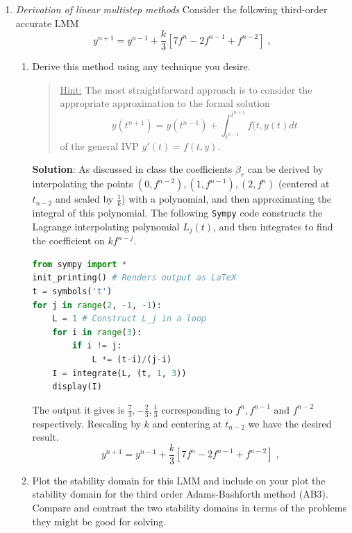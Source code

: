 \documentclass[final,oneside,onecolumn]{article}
\begin{document}
\begin{enumerate}
\bigbreak
\item \emph{Derivation of linear multistep methods} Consider the following third-order accurate LMM
\begin{equation*}
y^{n+1} = y^{n-1} + \dfrac{k}{3}\left[7f^{n} - 2f^{n-1} + f^{n-2}\right]\;,
\end{equation*}
\begin{enumerate}
\item Derive this method using any technique you desire.
\begin{quote}
{\footnotesize \underline{Hint:} The most straightforward approach is to
consider the appropriate approximation to the formal solution
\begin{equation*}
   y(t^{n+1}) = y(t^{n-1}) + \int_{t^{n-1}}^{t^{n+1}} f(t,y(t) dt
\end{equation*}
of the general IVP $y'(t) = f(t,y)$.
}\end{quote}

\bigbreak
{\large \bf Solution}: As discussed in class the coefficients $\beta_r$ can be derived by interpolating the points $(0, f^{n-2}), (1, f^{n-1}), (2, f^{n})$ (centered at $t_{n-2}$ and scaled by $\frac{1}{k}$) with a polynomial, and then approximating the integral of this polynomial. The following \texttt{Sympy} code constructs the Lagrange interpolating polynomial $L_j(t)$, and then integrates to find the coefficient on $kf^{n-j}$.
\begin{lstlisting}[language=Python]
from sympy import *
init_printing() # Renders output as LaTeX
t = symbols('t')
for j in range(2, -1, -1):
	L = 1 # Construct L_j in a loop
	for i in range(3):
		if i != j:
			L *= (t-i)/(j-i)
	I = integrate(L, (t, 1, 3))
	display(I)
\end{lstlisting}
The output it gives is $\frac{7}{3}, -\frac{2}{3}, \frac{1}{3}$ corresponding to $f^n, f^{n-1}$ and $f^{n-2}$ respectively. Rescaling by $k$ and centering at $t_{n-2}$ we have the desired result.
\begin{equation*}
y^{n+1} = y^{n-1} + \dfrac{k}{3}\left[7f^{n} - 2f^{n-1} + f^{n-2}\right]\;,
\end{equation*}

\bigbreak
\item Plot the stability domain for this LMM and include on your plot the stability
domain for the third order Adams-Bashforth method (AB3).  Compare and contrast the
two stability domains in terms of the problems they might be good for solving.
\end{enumerate}


\end{enumerate}
\end{document}
